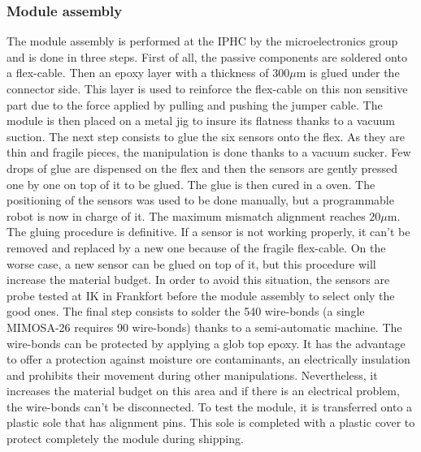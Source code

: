     \subsubsection{Module assembly}
    \label{subsec:modAssembly}

      The module assembly is performed at the IPHC by the microelectronics group and is done in three steps.
      First of all, the passive components are soldered onto a flex-cable.
      Then an epoxy layer with a thickness of $300 \mu\text{m}$ is glued under the connector side.
      This layer is used to reinforce the flex-cable on this non sensitive part due to the force applied by pulling and pushing the jumper cable.
      The module is then placed on a metal jig to insure its flatness thanks to a vacuum suction.
      The next step consists to glue the six sensors onto the flex.
      As they are thin and fragile pieces, the manipulation is done thanks to a vacuum sucker.
      Few drops of glue are dispensed on the flex and then the sensors are gently pressed one by one on top of it to be glued.
      The glue is then cured in a oven.
      The positioning of the sensors was used to be done manually, but a programmable robot is now in charge of it.
      The maximum mismatch alignment reaches $20 \mu\text{m}$. 
      The gluing procedure is definitive. 
      If a sensor is not working properly, it can't be removed and replaced by a new one because of the fragile flex-cable.
      On the worse case, a new sensor can be glued on top of it, but this procedure will increase the material budget.
      In order to avoid this situation, the sensors are probe tested at IK in Frankfort before the module assembly to select only the good ones.
      The final step consists to solder the 540 wire-bonds (a single MIMOSA-26 requires 90 wire-bonds) thanks to a semi-automatic machine.
      The wire-bonds can be protected by applying a glob top epoxy.
      It has the advantage to offer a protection against moisture ore contaminants, an electrically insulation and prohibits their movement during other manipulations. 
      Nevertheless, it increases the material budget on this area and if there is an electrical problem, the wire-bonds can't be disconnected.
      To test the module, it is transferred onto a plastic sole that has alignment pins.
      This sole is completed with a plastic cover to protect completely the module during shipping.


